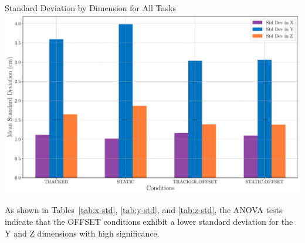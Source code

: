 \begin{figureBox}[label={fig:direction-std}, width=0.8\linewidth]{Standard Deviation by Dimension for All Tasks}
    \includegraphics[width=1.0\linewidth]{./evaluation/figures/direction-distribution.pdf}
\end{figureBox}

As shown in Tables~\ref{tab:x-std}, \ref{tab:y-std}, and \ref{tab:z-std}, the ANOVA tests indicate that the OFFSET conditions exhibit a lower standard deviation for the Y and Z dimensions with high significance.

